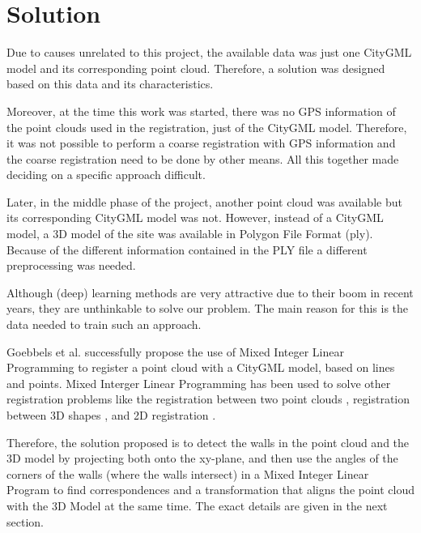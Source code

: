 

    \chapter{Solution}
    \label{chap:Solution}
        Due to causes unrelated to this project, the available data was just one CityGML model and its corresponding point cloud.
        Therefore, a solution was designed based on this data and its characteristics.

        Moreover, at the time this work was started, there was no GPS information of the point clouds used in the registration, just of the CityGML model. 
        Therefore, it was not possible to perform a coarse registration with GPS information and the coarse registration need to be done by other means.
        All this together made deciding on a specific approach difficult.

        Later, in the middle phase of the project, another point cloud was available but its corresponding CityGML model was not.
        However, instead of a CityGML model, a 3D model of the site was available in Polygon File Format (ply).
        Because of the different information contained in the PLY file a different preprocessing was needed.

        Although (deep) learning methods are very attractive due to their boom in recent years,
        they are unthinkable to solve our problem. The main reason for this is the data needed to train such an approach.

        Goebbels et al. \cite{Goebbels_2018_linebased, Goebbels_2018_alinear} successfully propose the use of Mixed Integer Linear Programming to register
        a point cloud with a CityGML model, based on lines and points.
        Mixed Interger Linear Programming has been used to solve other registration problems
        like the registration between two point clouds \cite{Sakakubara_2007_automatic},
        registration between 3D shapes \cite{Windheuser_2011_largescale},
        and 2D registration \cite{Bazin_2013_abranchandbound}.

        Therefore, the solution proposed is to detect the walls in the point cloud and the 3D model by projecting both onto the xy-plane,  
        and then use the angles of the corners of the walls (where the walls intersect)
        in a Mixed Integer Linear Program to find correspondences and a transformation that aligns the point cloud with the 3D Model at the same time.
        The exact details are given in the next section.

